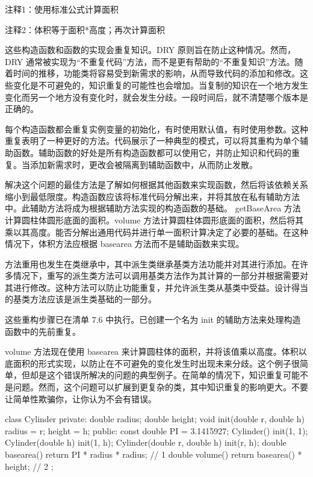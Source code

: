 {\footnotesize
注释1：使用标准公式计算面积

注释2：体积等于面积*高度；再次计算面积
}


这些构造函数和函数的实现会重复知识。DRY 原则旨在防止这种情况。然而，DRY 通常被实现为“不重复代码”方法，而不是更有帮助的“不重复知识”方法。随着时间的推移，功能类将容易受到新需求的影响，从而导致代码的添加和修改。这些变化是不可避免的，知识重复的可能性也会增加。当复制的知识在一个地方发生变化而另一个地方没有变化时，就会发生分歧。一段时间后，就不清楚哪个版本是正确的。

每个构造函数都会重复实例变量的初始化，有时使用默认值，有时使用参数。这种重复表明了一种更好的方法。代码展示了一种典型的模式，可以将其重构为单个辅助函数。辅助函数的好处是所有构造函数都可以使用它，并防止知识和代码的重复。当添加新需求时，更改会被隔离到辅助函数中，从而防止发散。


解决这个问题的最佳方法是了解如何根据其他函数来实现函数，然后将该依赖关系缩小到最低限度。构造函数应该将标准代码分解出来，并将其放在私有辅助方法中。此辅助方法将成为根据辅助方法实现的构造函数的基础。
getBaseArea 方法计算圆柱体圆形底面的面积。volume 方法计算圆柱体圆形底面的面积，然后将其乘以其高度。能否分解出通用代码并进行单一面积计算决定了必要的基础。在这种情况下，体积方法应根据 basearea 方法而不是辅助函数来实现。

方法重用也发生在类继承中，其中派生类继承基类方法功能并对其进行添加。在许多情况下，重写的派生类方法可以调用基类方法作为其计算的一部分并根据需要对其进行修改。这种方法可以防止功能重复，并允许派生类从基类中受益。设计得当的基类方法应该是派生类基础的一部分。

这些重构步骤已在清单 7.6 中执行。已创建一个名为 init 的辅助方法来处理构造函数中的先前重复。

volume 方法现在使用 basearea 来计算圆柱体的面积，并将该值乘以高度。体积以底面积的形式实现，以防止在不可避免的变化发生时出现未来分歧。这个例子很简单，但却是这个错误所解决的问题的典型例子。在简单的情况下，知识重复可能不是问题。然而，这个问题可以扩展到更复杂的类，其中知识重复的影响更大。不要让简单性欺骗你，让你认为不会有错误。


\begin{cpp}
class Cylinder {
private:
  double radius;
  double height;
  void init(double r, double h) {
    radius = r;
    height = h;
  }
public:
  const double PI = 3.1415927;
  Cylinder() { init(1, 1); }
  Cylinder(double h) { init(1, h); }
  Cylinder(double r, double h) { init(r, h); }
  double basearea() { return PI * radius * radius; } // 1
  double volume() { return basearea() * height; } // 2
};
\end{cpp}

